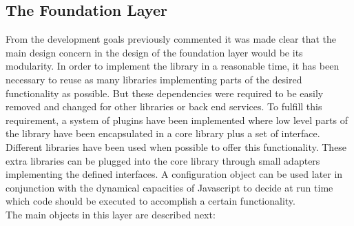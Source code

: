 \subsection{The Foundation Layer}
From the development goals previously commented it was made clear that the main design concern in the design of the foundation
layer would be its modularity. In order to implement the library in a reasonable time, it has been necessary to reuse as many libraries
implementing parts of the desired functionality as possible. But these dependencies were required to be easily removed and
changed for other libraries or back end services. To fulfill this requirement, a system of plugins have been
implemented where low level parts of the library have been encapsulated in a core library plus a set of
interface. Different libraries have been used when possible to offer this functionality. These extra libraries can be plugged
into the core library through small adapters implementing the defined interfaces. A configuration object
can be used later in conjunction with the dynamical capacities of Javascript to decide at run time which code should be
executed to accomplish a certain functionality.\\

The main objects in this layer are described next:

